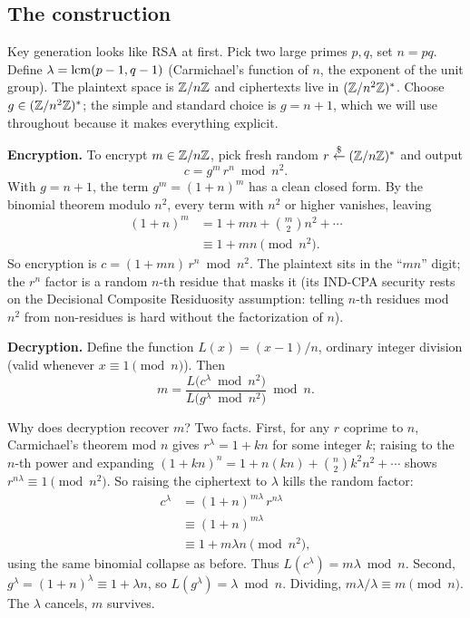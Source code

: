 \subsection{The construction}
\label{ch33:paillier-construction}

Key generation looks like RSA at first. Pick two large primes $p,q$, set $n = pq$. Define $\lambda = \operatorname{lcm}(p-1, q-1)$ (Carmichael's function of $n$, the exponent of the unit group). The plaintext space is $\mathbb{Z}/n\mathbb{Z}$ and ciphertexts live in $(\mathbb{Z}/n^2\mathbb{Z})^{*}$. Choose $g\in(\mathbb{Z}/n^2\mathbb{Z})^{*}$; the simple and standard choice is $g = n+1$, which we will use throughout because it makes everything explicit.

\textbf{Encryption.} To encrypt $m\in\mathbb{Z}/n\mathbb{Z}$, pick fresh random $r\stackrel{\$}{\gets} (\mathbb{Z}/n\mathbb{Z})^{*}$ and output
\[
  c = g^{m}\, r^{n} \bmod n^2 .
\]
With $g = n+1$, the term $g^m = (1+n)^m$ has a clean closed form. By the binomial theorem modulo $n^2$, every term with $n^2$ or higher vanishes, leaving
\begin{align*}
  (1+n)^m &= 1 + mn + \binom{m}{2}n^2 + \cdots \\
  &\equiv 1 + mn \pmod{n^2}.
\end{align*}
So encryption is $c = (1+mn)\,r^n \bmod n^2$. The plaintext sits in the ``$mn$'' digit; the $r^n$ factor is a random $n$-th residue that masks it (its IND-CPA security rests on the Decisional Composite Residuosity assumption: telling $n$-th residues mod $n^2$ from non-residues is hard without the factorization of $n$).

\textbf{Decryption.} Define the function $L(x) = (x-1)/n$, ordinary integer division (valid whenever $x\equiv 1 \pmod n$). Then
\[
  m = \frac{L\bigl(c^{\lambda}\bmod n^2\bigr)}{L\bigl(g^{\lambda}\bmod n^2\bigr)} \bmod n .
\]

\begin{whybox}
Why does decryption recover $m$? Two facts. First, for any $r$ coprime to $n$, Carmichael's theorem mod $n$ gives $r^\lambda = 1 + kn$ for some integer $k$; raising to the $n$-th power and expanding $(1+kn)^n = 1 + n(kn) + \binom{n}{2}k^2 n^2 + \cdots$ shows $r^{n\lambda}\equiv 1 \pmod{n^2}$. So raising the ciphertext to $\lambda$ kills the random factor:
\begin{align*}
  c^{\lambda} &= (1+n)^{m\lambda}\, r^{n\lambda} \\
  &\equiv (1+n)^{m\lambda} \\
  &\equiv 1 + m\lambda n \pmod{n^2},
\end{align*}
using the same binomial collapse as before. Thus $L(c^\lambda) = m\lambda \bmod n$. Second, $g^\lambda = (1+n)^\lambda \equiv 1 + \lambda n$, so $L(g^\lambda) = \lambda \bmod n$. Dividing, $m\lambda / \lambda \equiv m \pmod n$. The $\lambda$ cancels, $m$ survives.
\end{whybox}


